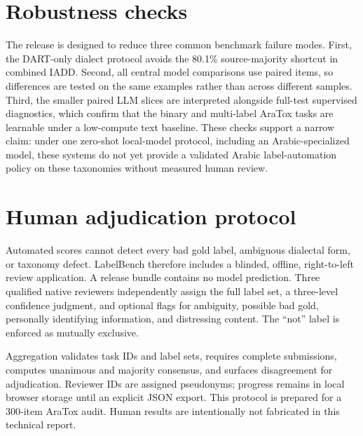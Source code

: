 \documentclass[10pt,twocolumn]{article}
\begin{document}
\section{Robustness checks}
The release is designed to reduce three common benchmark failure modes. First,
the DART-only dialect protocol avoids the 80.1\% source-majority shortcut in
combined IADD. Second, all central model comparisons use paired items, so
differences are tested on the same examples rather than across different
samples. Third, the smaller paired LLM slices are interpreted alongside
full-test supervised diagnostics, which confirm that the binary and
multi-label AraTox tasks are learnable under a low-compute text baseline. These
checks support a narrow claim: under one zero-shot local-model protocol,
including an Arabic-specialized model, these systems do not yet provide a
validated Arabic label-automation policy on these taxonomies without measured
human review.

\section{Human adjudication protocol}
Automated scores cannot detect every bad gold label, ambiguous dialectal form,
or taxonomy defect. LabelBench therefore includes a blinded, offline,
right-to-left review application. A release bundle contains no model
prediction. Three qualified native reviewers independently assign the full
label set, a three-level confidence judgment, and optional flags for ambiguity,
possible bad gold, personally identifying information, and distressing
content. The ``not'' label is enforced as mutually exclusive.

Aggregation validates task IDs and label sets, requires complete submissions,
computes unanimous and majority consensus, and surfaces disagreement for
adjudication. Reviewer IDs are assigned pseudonyms; progress remains in local
browser storage until an explicit JSON export. This protocol is prepared for a
300-item AraTox audit. Human results are intentionally not fabricated in this
technical report.
\end{document}
